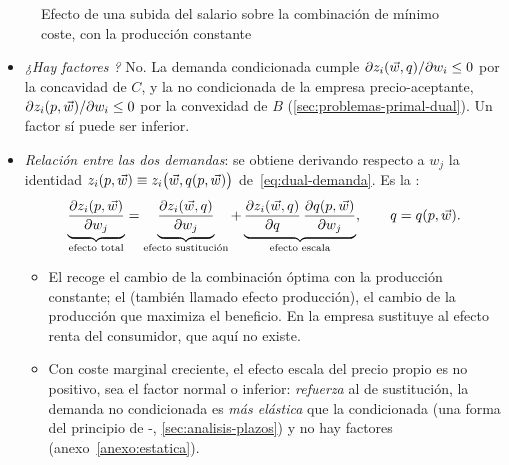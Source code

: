 \documentclass[11pt]{article}
\begin{document}
\begin{figure}[H]
\centering
\caption{Efecto de una subida del salario sobre la combinación de mínimo coste, con la producción constante}\label{fig:demanda-condicionada-w}
\end{figure}

\begin{itemize}
\item \emph{¿Hay factores ?} No. La demanda condicionada cumple $\partial z_i(\vec{w},q)/\partial w_i\leq 0$ por la concavidad de $C$, y la no condicionada de la empresa precio-aceptante, $\partial z_i(p,\vec{w})/\partial w_i\leq 0$ por la convexidad de $B$ (\ref{sec:problemas-primal-dual}). Un factor sí puede ser inferior.
\item \emph{Relación entre las dos demandas}: se obtiene derivando respecto a $w_j$ la identidad $z_i(p,\vec{w})\equiv z_i\big(\vec{w},q(p,\vec{w})\big)$ de~\eqref{eq:dual-demanda}. Es la  :
  \begin{equation}
  \underbrace{\frac{\partial z_i(p,\vec{w})}{\partial w_j}}_{\text{efecto total}}=\underbrace{\frac{\partial z_i(\vec{w},q)}{\partial w_j}}_{\text{efecto sustitución}}+\underbrace{\frac{\partial z_i(\vec{w},q)}{\partial q}\,\frac{\partial q(p,\vec{w})}{\partial w_j}}_{\text{efecto escala}},\qquad q=q(p,\vec{w}). \label{eq:slutsky-factores}
  \end{equation}
  \begin{itemize}
  \item El  recoge el cambio de la combinación óptima con la producción constante; el  (también llamado efecto producción), el cambio de la producción que maximiza el beneficio. En la empresa sustituye al efecto renta del consumidor, que aquí no existe.
  \item Con coste marginal creciente, el efecto escala del precio propio es no positivo, sea el factor normal o inferior: \emph{refuerza} al de sustitución, la demanda no condicionada es \emph{más elástica} que la condicionada (una forma del principio de -, \ref{sec:analisis-plazos}) y no hay factores  (anexo~\ref{anexo:estatica}).
  \end{itemize}
\end{itemize}
\end{document}

